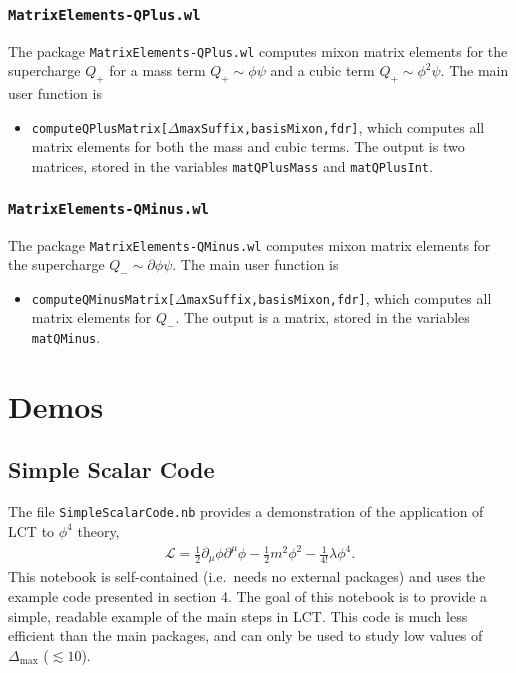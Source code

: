 \documentclass[12pt]{article}
\def\half{\frac{1}{2}}
\newcommand{\be}{\begin{eqnarray}}
\newcommand{\ee}{\end{eqnarray}}
\newcommand{\Lcal}{{\mathcal L}}
\newcommand\De\Delta
\newcommand{\p}{\partial}
\newcommand{\fr}{\frac}
\newcommand{\Dmax}{\De_{\max}}
\begin{document}
\subsubsection*{{\tt MatrixElements-QPlus.wl}}

The package {\tt MatrixElements-QPlus.wl} computes mixon matrix elements for the supercharge $Q_+$ for a mass term $Q_+ \sim \phi \psi$ and a cubic term $Q_+ \sim \phi^2 \psi$.   The main user function is
\begin{itemize}
\item {\tt computeQPlusMatrix[$\De$maxSuffix,basisMixon,fdr]}, which computes all matrix elements for both the mass and cubic terms. The output is two matrices,  stored in the variables {\tt matQPlusMass} and {\tt matQPlusInt}.
\end{itemize}

\subsubsection*{{\tt MatrixElements-QMinus.wl}}

The package {\tt MatrixElements-QMinus.wl} computes mixon matrix elements for the supercharge $Q_- \sim \p \phi \psi$.   The main user function is
\begin{itemize}
\item {\tt computeQMinusMatrix[$\De$maxSuffix,basisMixon,fdr]}, which computes all matrix elements for $Q_-$. The output is a matrix,  stored in the variables {\tt matQMinus}.
\end{itemize}



\section{Demos}

\subsection{Simple Scalar Code}

The file {\tt SimpleScalarCode.nb} provides a demonstration of the application of LCT to $\phi^4$ theory,
\be
\Lcal = \half \p_\mu\phi\p^\mu\phi - \half m^2 \phi^2 - \fr{1}{4!} \lambda \phi^4.
\ee
This notebook is self-contained (i.e.~needs no external packages) and uses the example code presented in section 4. The goal of this notebook is to provide a simple, readable example of the main steps in LCT. This code is much less efficient than the main packages, and can only be used to study low values of $\Dmax$ ($\lesssim 10$).
\end{document}
